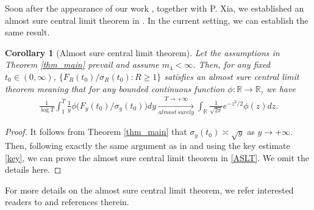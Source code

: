 \documentclass[letterpaper, 11pt,  reqno]{amsart}
\newtheorem{corollary}[theorem]{Corollary}
\newcommand{\R}{\mathbb{R}}
\newcommand{\s}{\sigma}
\numberwithin{equation}{section}
\numberwithin{theorem}{section}
\begin{document}
Soon after the appearance of our work \cite{BZ23},
together with P. Xia, we established an almost sure central limit theorem
in \cite{BXZ23}.  In the current setting,  we can establish the same result. 


\begin{corollary}[\textsf{Almost sure central limit theorem}] 
Let the assumptions in Theorem \ref{thm_main} prevail
and assume $m_4 < \infty$. Then, for any fixed $t_0\in(0,\infty)$,
$\big\{ F_R(t_0)/\s_R(t_0) : R\geq 1\}$ satisfies an almost sure central limit theorem
meaning that for any bounded continuous function $\phi:\R\to\R$, 
we have 
\begin{align}\label{ASLT}
\frac{1}{\log T} \int_1^T \frac{1}{y} \phi \big(  F_y(t_0)/\s_y(t_0)    \big) dy
\xrightarrow[almost \,surely]{T\to+\infty}  \int_\R \frac{1}{\sqrt{2\pi}} e^{-z^2/2} \phi(z) dz.
\end{align}


 
 
\end{corollary}

\begin{proof}  It follows from Theorem \ref{thm_main} that 
$\s_y(t_0) \asymp \sqrt{y}$ as $y\to+\infty$. Then, following exactly
the same argument as in \cite[Section 3.1]{BXZ23} and using the key estimate \eqref{key},
we can prove the   almost sure central limit theorem in \eqref{ASLT}. 
We omit the details here. 
\qedhere
\end{proof}

For more details on the almost sure central limit theorem, we refer interested 
readers to \cite{BXZ23} and references therein. 

\smallskip
\end{document}
